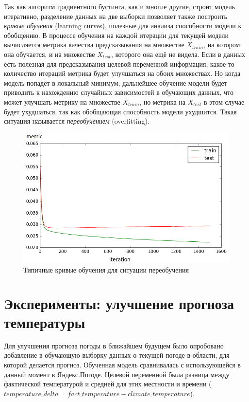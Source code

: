 \documentclass[14pt]{matmex-diploma}
\begin{document}
Так как алгоритм градиентного бустинга, как и многие другие, строит модель итеративно, разделение данных на две выборки позволяет также построить \textit{кривые обучения} (learning curves), полезные для анализа способности модели к обобщению. В процессе обучения на каждой итерации для текущей модели вычисляется метрика качества предсказывания на множестве $X_{train}$, на котором она обучается, и на множестве $X_{test}$, которого она ещё не видела. Если в данных есть полезная для предсказывания целевой переменной информация, какое-то количество итераций метрика будет улучшаться на обоих множествах. Но когда модель попадёт в локальный минимум, дальнейшее обучение модели будет приводить к нахождению случайных зависимостей в обучающих данных, что может улучшать метрику на множестве $X_{train}$, но метрика на $X_{test}$ в этом случае будет ухудшаться, так как обобщающая способность модели ухудшится. Такая ситуация называется \textit{переобучением} (overfitting).


\begin{figure}
\centering
\includegraphics[width=0.9\linewidth]{images/pic6_learning_curves_overfitting.png}
\caption{Типичные кривые обучения для ситуации переобучения}
\label{pic6_learning_curves_overfitting}
\end{figure}




\section{Эксперименты: улучшение прогноза температуры}

Для улучшения прогноза погоды в ближайшем будущем было опробовано добавление в обучающую выборку данных о текущей погоде в области, для которой делается прогноз. Обученная модель сравнивалась с использующейся в данный момент в Яндекс.Погоде. Целевой переменной была разница между фактической температурой и средней для этих местности и времени ($temperature\_delta = fact\_temperature - climate\_temperature$).
\end{document}
